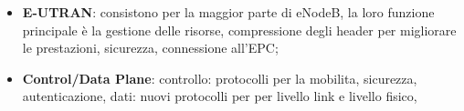 \documentclass[12pt]{article}
\begin{document}
\begin{itemize}
        \begin{itemize}
            \item radio bearer: connessione tra UE e eNodeB;
            \item s1 bearer: connessione tra eNodeB e l'S-GW (Service Gateway);
            \item s5 bearer: connette il S-GW al P-GW.
        \end{itemize}
    \item \textbf{E-UTRAN}: consistono per la maggior parte di eNodeB, la loro funzione principale \`e la gestione delle risorse, compressione degli header per migliorare le prestazioni, sicurezza, connessione all'EPC;
    \item \textbf{Control/Data Plane}: controllo: protocolli per la mobilita, sicurezza, autenticazione, dati: nuovi protocolli per per livello link e livello fisico,
\end{itemize}
\end{document}
